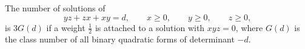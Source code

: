 \begin{proposition}
The number of solutions of
\[
    yz+zx+xy=d,\qquad x\ge0,\qquad y\ge0,\qquad z\ge0,
\]
is $3G(d)$ if a weight $\frac12$ is attached to a solution with $xyz=0$, where
$G(d)$ is the class number of all binary quadratic forms of determinant $-d$.
\end{proposition}

